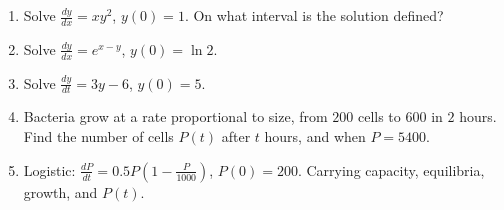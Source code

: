 \documentclass[12pt]{article}
\begin{document}
\begin{enumerate}
\begin{enumerate}
\item[(f)] Solve $\frac{dy}{dx}=xy^2$, $y(0)=1$. On what interval is the solution defined?

\item[(g)] Solve $\frac{dy}{dx}=e^{x-y}$, $y(0)=\ln2$.

\item[(h)] Solve $\frac{dy}{dt}=3y-6$, $y(0)=5$.

\item[(i)] Bacteria grow at a rate proportional to size, from $200$ cells to $600$ in $2$ hours. Find the number of cells $P(t)$ after $t$ hours, and when $P=5400$.

\item[(j)] Logistic: $\frac{dP}{dt}=0.5P\left(1-\frac{P}{1000}\right)$, $P(0)=200$. Carrying capacity, equilibria, growth, and $P(t)$.

\end{enumerate}

\end{enumerate}
\end{document}
